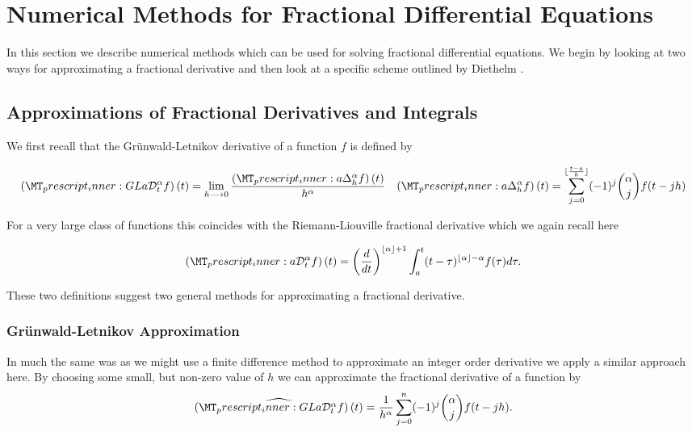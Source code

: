 
\section{Numerical Methods for Fractional Differential Equations}

In this section we describe numerical methods which can be used for solving fractional differential equations. We begin by looking at two ways for approximating a fractional derivative and then look at a specific scheme outlined by Diethelm \cite{Diethelm2011}.

\subsection{Approximations of Fractional Derivatives and Integrals}

We first recall that the Gr\"{u}nwald-Letnikov derivative of a function $ f $ is defined by

\begin{align}
    \glder{a}{t}{\alpha}{f}(t) = \lim_{h \lra 0} \frac{\fracdelta{a}{\alpha}{h}{f}(t)}{h^\alpha} & & \fracdelta{a}{\alpha}{h}{f}(t) = \sum_{j=0}^{\lfloor \frac{t-a}{h} \rfloor} (-1)^{j} { \alpha \choose j } f(t-jh)
\end{align}

For a very large class of functions this coincides with the Riemann-Liouville fractional derivative \cite{Podlubny1999} which we again recall here 

\begin{align}
    \rld{a}{t}{\alpha}{f}(t) = \left( \frac{d}{dt} \right)^{\lfloor \alpha \rfloor + 1} \int_{a}^{t}(t-\tau)^{\lfloor \alpha \rfloor - \alpha} f(\tau)d\tau.
\end{align}

These two definitions suggest two general methods for approximating a fractional derivative.

\subsubsection{Gr\"{u}nwald-Letnikov Approximation}
In much the same was as we might use a finite difference method to approximate an integer order derivative we apply a similar approach here. By choosing some small, but non-zero value of $ h $ we can approximate the fractional derivative of a function by
\begin{align}
    \widehat{ \glder{a}{t}{\alpha}{f}(t) } = \frac{1}{h^\alpha} \sum_{j=0}^n (-1)^j {\alpha \choose j} f(t - jh).
\end{align}

